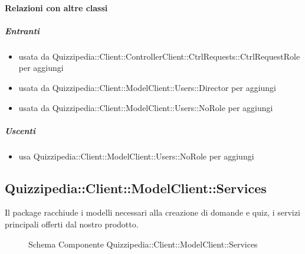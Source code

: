 \paragraph{Relazioni con altre classi}
\subparagraph{Entranti}
\begin{itemize}
\item usata da Quizzipedia::Client::ControllerClient::CtrlRequests::CtrlRequestRole per aggiungi
\item usata da Quizzipedia::Client::ModelClient::Users::Director per aggiungi
\item usata da Quizzipedia::Client::ModelClient::Users::NoRole per aggiungi
\end{itemize}
\subparagraph{Uscenti}
\begin{itemize}
\item usa Quizzipedia::Client::ModelClient::Users::NoRole per aggiungi
\end{itemize}
\subsection{Quizzipedia::Client::ModelClient::Services}
Il package racchiude i modelli necessari alla creazione di domande e quiz, i servizi principali offerti dal nostro prodotto.
\begin{figure}[H]
\centering
\noindent{}
\caption[Schema Componente Quizzipedia::Client::ModelClient::Services]{Schema Componente Quizzipedia::Client::ModelClient::Services}
\end{figure}
